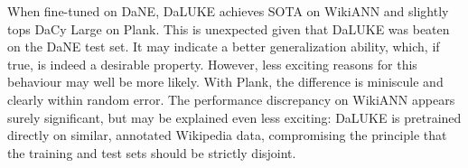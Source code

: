 \documentclass[main.tex]{subfiles}
\begin{document}
When fine-tuned on DaNE, DaLUKE achieves SOTA on WikiANN and slightly tops DaCy Large on Plank.
This is unexpected given that DaLUKE was beaten on the DaNE test set.
It may indicate a better generalization ability, which, if true, is indeed a desirable property.
However, less exciting reasons for this behaviour may well be more likely.
With Plank, the difference is miniscule and clearly within random error.
The performance discrepancy on WikiANN appears surely significant, but may be explained even less exciting:
DaLUKE is pretrained directly on similar, annotated Wikipedia data, compromising the principle that the training and test sets should be strictly disjoint.
\end{document}

